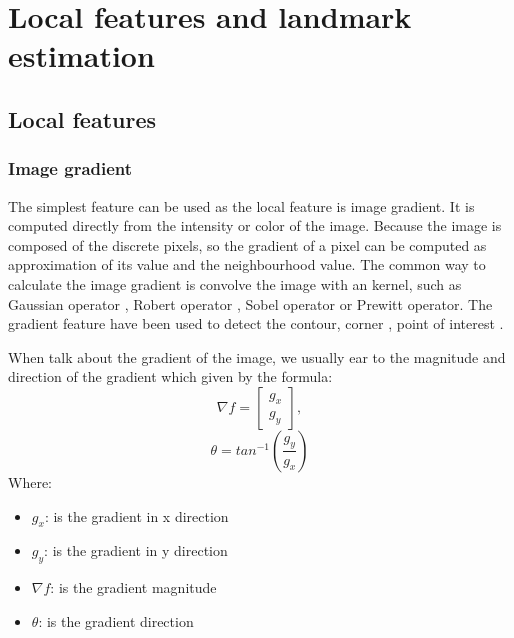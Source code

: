 \chapter{Local features and landmark estimation}
\section{Local features}

\subsection{Image gradient}
The simplest feature can be used as the local feature is image gradient. It is computed directly from the intensity or color of the image. Because the image is composed of the discrete pixels, so the gradient of a pixel can be computed as approximation of its value and the neighbourhood value. The common way to calculate the image gradient is convolve the image with an kernel, such as Gaussian operator \cite{maini2009study}, Robert operator \cite{maini2009study}, Sobel operator \cite{maini2009study} or Prewitt operator\cite{maini2009study}. The gradient feature have been used to detect the contour\cite{canny1986computational}, corner \cite{smith1997susan}, point of interest \cite{lowe2004distinctive}.

When talk about the gradient of the image, we usually ear to the magnitude and direction of the gradient which given by the formula:
\begin{equation}
	\nabla f = \begin{bmatrix}
					g_x \\
					g_y
				\end{bmatrix},  
\end{equation}
\begin{equation}
	\theta = tan^{-1}(\frac{g_y}{g_x})
\end{equation}
Where: 
\begin{itemize}
	\item $g_x$: is the gradient in x direction
	\item $g_y$: is the gradient in y direction
	\item $\nabla f$: is the gradient magnitude
	\item $\theta$: is the gradient direction
\end{itemize}
